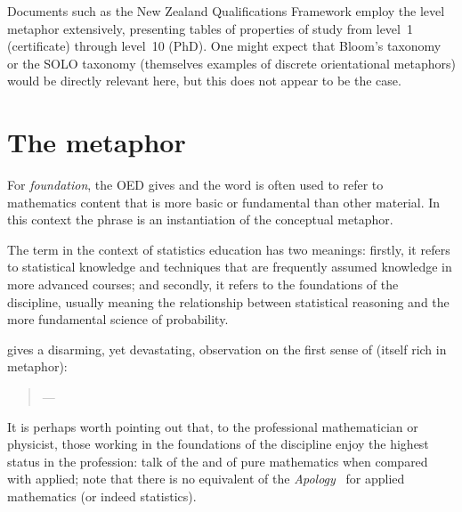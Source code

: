 \noindent
Documents such as the New Zealand Qualifications Framework employ the
level metaphor extensively, presenting tables of properties of study
from level~1 (certificate) through level~10 (PhD).  One might expect
that Bloom's taxonomy or the SOLO taxonomy (themselves examples of
discrete orientational metaphors) would be directly relevant here, but
this does not appear to be the case.

\section{The  metaphor}

For \emph{foundation}, the OED gives  and the word is
often used to refer to mathematics content that is more basic or
fundamental than other material.  In this context the phrase is an
instantiation of the  conceptual
metaphor.

The term  in the context of statistics education
has two meanings: firstly, it refers to statistical knowledge and
techniques that are frequently assumed knowledge in more advanced
courses; and secondly, it refers to the foundations of the discipline,
usually meaning the relationship between statistical reasoning and the
more fundamental science of probability.

 gives a disarming, yet devastating, observation on
the first sense of  (itself rich in metaphor):

\begin{singlespace}
\begin{quote}
  ---
\end{quote}
\end{singlespace}

\noindent
It is perhaps worth pointing out that, to the professional
mathematician or physicist, those working in the foundations of the
discipline enjoy the highest status in the profession:
\cite[pp469--571]{mcculloch2013} talk of the  and
 of pure mathematics when compared with
applied; note that there is no equivalent of the
\emph{Apology}~\parencite{hardy1940} for applied mathematics (or
indeed statistics).

